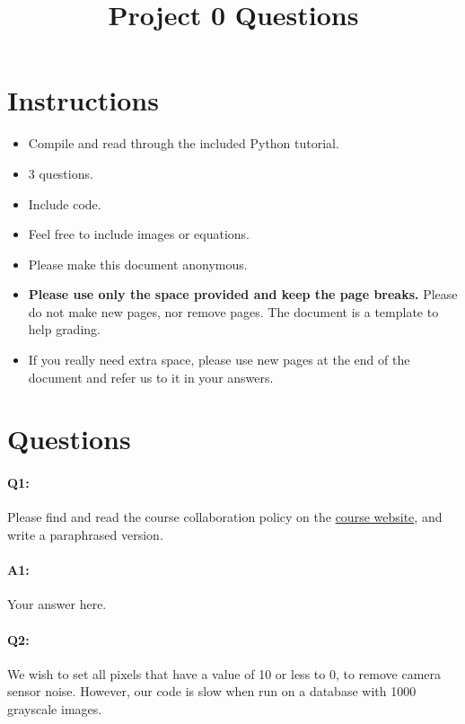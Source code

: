 \documentclass[11pt]{article}
\date{}
\title{\vspace{-1cm}Project 0 Questions}
\begin{document}
\maketitle
\vspace{-2cm}
\thispagestyle{fancy}

\section*{Instructions}
\begin{itemize}
  \item Compile and read through the included Python tutorial.
  \item 3 questions.
  \item Include code.
  \item Feel free to include images or equations.
  \item Please make this document anonymous.
  \item \textbf{Please use only the space provided and keep the page breaks.} Please do not make new pages, nor remove pages. The document is a template to help grading.
  \item If you really need extra space, please use new pages at the end of the document and refer us to it in your answers.
\end{itemize}

\section*{Questions}

\paragraph{Q1:} Please find and read the course collaboration policy on the \href{http://cs.brown.edu/courses/csci1430/}{course website}, and write a paraphrased version.

\paragraph{A1:} Your answer here.




\pagebreak
\paragraph{Q2:} We wish to set all pixels that have a value of 10 or less to 0, to remove camera sensor noise. However, our code is slow when run on a database with 1000 grayscale images.
\end{document}
